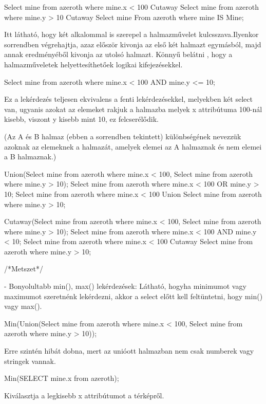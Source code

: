 \begin{sql}
\begin{sql}
Select mine from azeroth where mine.x < 100 Cutaway Select mine from azeroth where mine.y > 10 Cutaway Select mine From azeroth where mine IS Mine;
\end{sql}
Itt látható, hogy két alkalommal is szerepel a halmazművelet kulcsszava.Ilyenkor sorrendben végrehajtja, azaz először kivonja az első két halmazt egymásból, majd annak eredményéből kivonja az utolsó halmazt.
Könnyű belátni , hogy a halmazműveletek helyettesíthetőek logikai kifejezésekkel.

\begin{sql}
Select mine from azeroth where mine.x < 100 AND mine.y <= 10;
\end{sql}
Ez a lekérdezés teljesen ekvivalens a fenti lekérdezésekkel, melyekben két select van, ugyanis azokat az elemeket rakjuk a halmazba melyek x attribútuma 100-nál kisebb, viszont y kisebb mint 10, ez felcserélődik.

(Az A és B halmaz (ebben a sorrendben tekintett) különbségének nevezzük azoknak az elemeknek a halmazát, amelyek elemei az A halmaznak és nem elemei a B halmaznak.)

\begin{sql}
Union(Select mine from azeroth where mine.x < 100, Select mine from azeroth where mine.y > 10);
Select mine from azeroth where mine.x < 100 OR mine.y > 10;
Select mine from azeroth where mine.x < 100 Union Select mine from azeroth where mine.y > 10;
\end{sql}

\begin{sql}
Cutaway(Select mine from azeroth where mine.x < 100, Select mine from azeroth where mine.y > 10);
Select mine from azeroth where mine.x < 100 AND mine.y < 10;
Select mine from azeroth where mine.x < 100 Cutaway Select mine from azeroth where mine.y > 10;
\end{sql}

/*Metszet*/

- Bonyolultabb min(), max() lekérdezések: Látható, hogyha minimumot vagy maximumot szeretnénk lekérdezni, akkor a select előtt kell feltüntetni, hogy min() vagy max().

\begin{sql}
Min(Union(Select mine from azeroth where mine.x < 100, Select mine from azeroth where mine.y > 10));
\end{sql}
Erre szintén hibát dobna, mert az unióott halmazban nem csak numberek vagy stringek vannak.

\begin{sql}
Min(SELECT mine.x from azeroth);
\end{sql}
Kiválasztja a legkisebb x attribútumot a térképről.


\end{sql}
